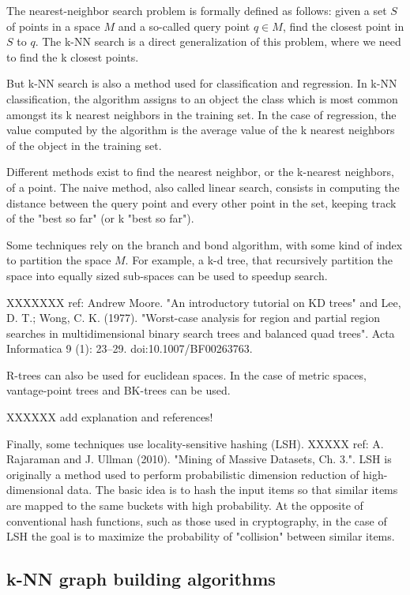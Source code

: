 \documentclass[wcp]{jmlr}
\begin{document}
The nearest-neighbor search problem is formally defined as follows: given a set $S$ of points in a space $M$ and a so-called query point $q \in M$, find the closest point in $S$ to $q$. The k-NN search is a direct generalization of this problem, where we need to find the k closest points.

But k-NN search is also a method used for classification and regression. In k-NN classification, the algorithm assigns to an object the class which is most common amongst its k nearest neighbors in the training set. In the case of regression, the value computed by the algorithm is the average value of the k nearest neighbors of the object in the training set.

Different methods exist to find the nearest neighbor, or the k-nearest neighbors, of a point. The naive method, also called linear search, consists in computing the distance between the query point and every other point in the set, keeping track of the "best so far" (or k "best so far").

Some techniques rely on the branch and bond algorithm, with some kind of index to partition the space $M$. For example, a k-d tree, that recursively partition the space into equally sized sub-spaces can be used to speedup search.

XXXXXXX ref:  Andrew Moore. "An introductory tutorial on KD trees" and Lee, D. T.; Wong, C. K. (1977). "Worst-case analysis for region and partial region searches in multidimensional binary search trees and balanced quad trees". Acta Informatica 9 (1): 23–29. doi:10.1007/BF00263763.

R-trees can also be used for euclidean spaces. In the case of metric spaces, vantage-point trees and BK-trees can be used.

XXXXXX add explanation and references!

Finally, some techniques use locality-sensitive hashing (LSH).
XXXXX ref:  A. Rajaraman and J. Ullman (2010). "Mining of Massive Datasets, Ch. 3.".
LSH is originally a method used to perform probabilistic dimension reduction of high-dimensional data. The basic idea is to hash the input items so that similar items are mapped to the same buckets with high probability. At the opposite of conventional hash functions, such as those used in cryptography, in the case of LSH the goal is to maximize the probability of "collision" between similar items.

\subsection{k-NN graph building algorithms}
\end{document}
